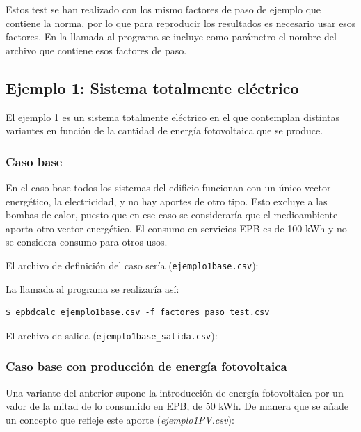 \documentclass[10pt,notitlepage,oneside,a4paper]{article}
\begin{document}
Estos test se han realizado con los mismo factores de paso de ejemplo que contiene la norma, por lo que para reproducir los resultados es necesario usar esos factores. En la llamada al programa se incluye como parámetro el nombre del archivo que contiene esos factores de paso.

\subsection{Ejemplo 1: Sistema totalmente eléctrico}
El ejemplo 1 es un sistema totalmente eléctrico en el que contemplan distintas variantes en función de la cantidad de energía fotovoltaica que se produce.


\subsubsection{Caso base}
 
En el caso base todos los sistemas del edificio funcionan con un único vector energético, la electricidad, y no hay aportes de otro tipo. Esto excluye a las bombas de calor, puesto que en ese caso se consideraría que el medioambiente aporta otro vector energético. El consumo en servicios EPB es de 100 kWh y no se considera consumo para otros usos.

El archivo de definición del caso sería (\texttt{ejemplo1base.csv}):


La llamada al programa se realizaría así:

\begin{Verbatim}[fontsize=\small]
    $ epbdcalc ejemplo1base.csv -f factores_paso_test.csv
\end{Verbatim}

El archivo de salida (\texttt{ejemplo1base\_salida.csv}):


\subsubsection{Caso base con producción de energía fotovoltaica}

Una variante del anterior supone la introducción de energía fotovoltaica por un valor de la mitad de lo consumido en EPB, de 50 kWh. De manera que se añade un concepto que refleje este aporte (\textit{ejemplo1PV.csv}):
\end{document}
